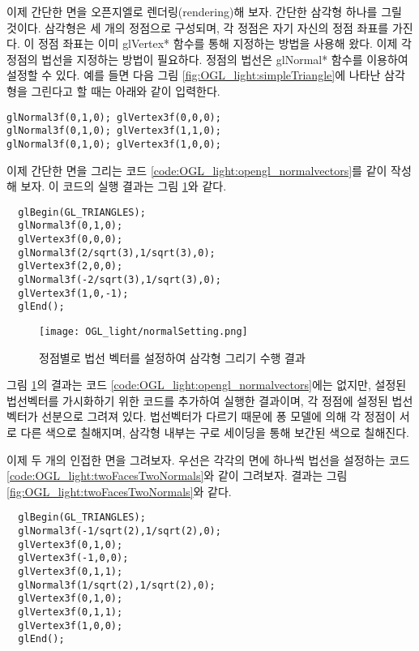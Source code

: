 이제 간단한 면을 오픈지엘로 렌더링(rendering)해 보자.
간단한 삼각형 하나를 그릴 것이다. 삼각형은 세 개의 정점으로 구성되며, 각 정점은 자기 자신의 정점 좌표를 가진다. 
이 정점 좌표는 이미 {\sf glVertex*} 함수를 통해 지정하는 방법을 사용해 왔다. 이제 각 정점의 법선을 지정하는 방법이 필요하다. 
정점의 법선은 {\sf glNormal*} 함수를 이용하여 설정할 수 있다. 예를 들면 다음 그림 \ref{fig:OGL_light:simpleTriangle}에 나타난 
삼각형을 그린다고 할 때는 아래와 같이 입력한다.

\begin{verbatim}
glNormal3f(0,1,0); glVertex3f(0,0,0);
glNormal3f(0,1,0); glVertex3f(1,1,0);
glNormal3f(0,1,0); glVertex3f(1,0,0);
\end{verbatim}

이제 간단한 면을 그리는 코드 \ref{code:OGL_light:opengl_normalvectors}를  같이 작성해 보자. 이 코드의 실행 결과는 그림 \ref{fig:OGL_light:normalSetting}와 같다. 

\begin{algorithmbis}\label{code:OGL_light:opengl_normalvectors}
\lstset{language=C++} 
\begin{lstlisting}
  glBegin(GL_TRIANGLES);
  glNormal3f(0,1,0);
  glVertex3f(0,0,0);
  glNormal3f(2/sqrt(3),1/sqrt(3),0);
  glVertex3f(2,0,0);
  glNormal3f(-2/sqrt(3),1/sqrt(3),0);
  glVertex3f(1,0,-1);
  glEnd();
\end{lstlisting}
\end{algorithmbis}

\begin{figure}[h!]
  \centering
    \texttt{[image: OGL\_light/normalSetting.png]}
    \caption{정점별로 법선 벡터를 설정하여 삼각형 그리기 수행 결과}
    \label{fig:OGL_light:normalSetting}
\end{figure}

그림 \ref{fig:OGL_light:normalSetting}의 결과는 코드 \ref{code:OGL_light:opengl_normalvectors}에는 없지만,
설정된 법선벡터를 가시화하기 위한 코드를 추가하여 실행한 결과이며, 각 정점에 설정된 법선 벡터가 선분으로 그려져 있다.
법선벡터가 다르기 때문에 퐁 모델에 의해 각 정점이 서로 다른 색으로 칠해지며,
삼각형 내부는 구로 세이딩을 통해 보간된 색으로 칠해진다.

이제 두 개의 인접한 면을 그려보자. 우선은 각각의 면에 하나씩 법선을 설정하는
코드 \ref{code:OGL_light:twoFacesTwoNormals}와 같이 그려보자. 결과는 그림 \ref{fig:OGL_light:twoFacesTwoNormals}와 같다.

\begin{algorithmbis}[두 개의 면 그리기]\label{code:OGL_light:twoFacesTwoNormals}
\lstset{language=C++} 
\begin{lstlisting}
  glBegin(GL_TRIANGLES);
  glNormal3f(-1/sqrt(2),1/sqrt(2),0);
  glVertex3f(0,1,0);
  glVertex3f(-1,0,0);
  glVertex3f(0,1,1);
  glNormal3f(1/sqrt(2),1/sqrt(2),0);
  glVertex3f(0,1,0);
  glVertex3f(0,1,1);
  glVertex3f(1,0,0);
  glEnd();
\end{lstlisting}
\end{algorithmbis}

